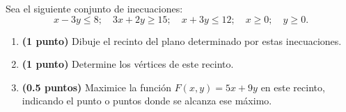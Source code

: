 
Sea el siguiente conjunto de inecuaciones:
\[
x-3y\leq8;\quad3x+2y\geq15;\quad x+3y\leq12;\quad x\geq0;\quad y\geq0.
\]
\begin{enumerate}[label=\alph*)]
\item \textbf{(1 punto)} Dibuje el recinto del plano determinado por estas inecuaciones.
\item \textbf{(1 punto)} Determine los vértices de este recinto.
\item \textbf{(0.5 puntos)} Maximice la función $F(x,y)=5x+9y$ en este recinto, indicando el punto o puntos donde se alcanza ese máximo.
\end{enumerate}
